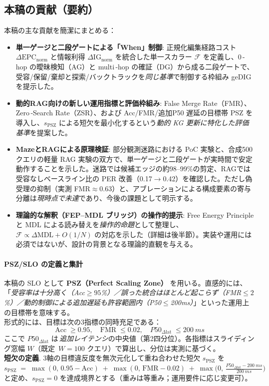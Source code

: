 \documentclass[ja=standard,xelatex]{bxjsarticle}
\newcommand{\F}{\mathcal{F}}
\newcommand{\gednorm}{\Delta\mathrm{EPC}_{\mathrm{norm}}}
\newcommand{\ignorm}{\Delta\mathrm{IG}_{\mathrm{norm}}}
\begin{document}
\subsection*{本稿の貢献（要約）}
本稿の主な貢献を簡潔にまとめる：
\begin{itemize}[leftmargin=1.6em]
  \item \textbf{単一ゲージと二段ゲートによる「When」制御}: 正規化編集経路コスト $\gednorm$ と情報利得 $\ignorm$ を統合した単一スカラー $\F$ を定義し、0\,\mbox{-}hop の曖昧検知（AG）と multi\,\mbox{-}hop の確証（DG）から成る二段ゲートで、受容/保留/棄却と探索/バックトラックを\emph{同じ基準}で制御する枠組み geDIG を提示した。
  \item \textbf{動的RAG向けの新しい運用指標と評価枠組み}: False Merge Rate（FMR）、Zero\,\mbox{-}Search Rate（ZSR）、および Acc/FMR/追加P50 遅延の目標帯 PSZ を導入し、$s_{\mathrm{PSZ}}$ による短欠を最小化するという\emph{動的 KG 更新に特化した評価基準}を提案した。
  \item \textbf{MazeとRAGによる原理検証}: 部分観測迷路における PoC 実験と、合成500クエリの軽量 RAG 実験の双方で、単一ゲージと二段ゲートが実時間で安定動作することを示した。迷路では候補エッジの約98--99\%の剪定、RAGでは受容なしベースライン比の PER 改善（0.17$\to$0.42）を確認した。ただし偽受理の抑制（実測 FMR$\approx$0.63）と、アブレーションによる構成要素の寄与分離は\emph{現時点で未達}であり、今後の課題として明示する。
  \item \textbf{理論的な解釈（FEP--MDL ブリッジ）の操作的提示}: Free Energy Principle と MDL による読み替えを\emph{操作的命題}として整理し、$\F\propto\Delta\mathrm{MDL}{+}O(1/N)$ の対応を示した（詳細は後半節）。実装や運用には必須ではないが、設計の背景となる理論的直観を与える。
\end{itemize}

\paragraph{PSZ/SLO の定義と集計} 本稿の SLO として \textbf{PSZ（Perfect Scaling Zone）} を用いる。直感的には、「\emph{受容率は十分高く（Acc$\ge95$\%）／誤った統合はほとんど起こらず（FMR$\le2$\%）／動的制御による追加遅延も許容範囲内（P50$\le$200ms）}」といった運用上の目標帯を意味する。\\
\noindent 形式的には、目標は次の3指標の同時充足である：
\begin{equation}
  \mathrm{Acc}\;\ge 0.95,\quad \mathrm{FMR}\;\le 0.02,\quad P50_{\Delta \mathrm{lat}}\;\le \SI{200}{ms} \label{eq:psz_targets}
\end{equation}
ここで $P50_{\Delta \mathrm{lat}}$ は\,\emph{追加レイテンシ}の中央値（第2四分位）。各指標はスライディング窓幅 $W$（既定 \,$W{=}100$ クエリ）で算出し、分位は実測に基づく。\\
\noindent \textbf{短欠の定義}. 3軸の目標違反度を無次元化して重ね合わせた短欠 $s_{\mathrm{PSZ}}$ を
\begin{equation}
  s_{\mathrm{PSZ}}\;=\;\max(0,\,0.95{-}\mathrm{Acc})\; +\; \max(0,\,\mathrm{FMR}{-}0.02)\; +\; \max\!\bigl(0,\,\tfrac{P50_{\Delta \mathrm{lat}}{-}\SI{200}{ms}}{\SI{200}{ms}}\bigr) \label{eq:psz_deficit}
\end{equation}
と定め、$s_{\mathrm{PSZ}}{=}0$ を達成境界とする（重みは等重み；運用要件に応じ変更可）。
\end{document}
